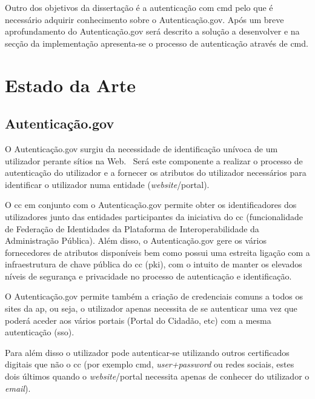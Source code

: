 Outro dos objetivos da dissertação é a autenticação com \acrfull{cmd} pelo que é necessário adquirir conhecimento sobre o Autenticação.gov.
Após um breve aprofundamento do Autenticação.gov será descrito a solução a desenvolver e na secção da implementação apresenta-se o processo de autenticação através de \acrlong{cmd}.

\section{Estado da Arte}

\subsection{Autenticação.gov}
O Autenticação.gov surgiu da necessidade de identificação unívoca de um utilizador perante sítios na 
Web.~\cite{agov} Será este componente a realizar o processo de autenticação do utilizador e a fornecer
 os atributos do utilizador necessários para identificar o utilizador numa entidade (\textit{website}/portal).

O \acrshort{cc} em conjunto com o Autenticação.gov permite obter os identificadores dos utilizadores junto das 
entidades participantes da iniciativa do \acrshort{cc} (funcionalidade de Federação de Identidades da Plataforma 
de Interoperabilidade da Administração Pública). Além disso, o Autenticação.gov gere os vários fornecedores de 
atributos disponíveis bem como possui uma estreita ligação com a infraestrutura de chave pública do \acrlong{cc} 
(\acrfull{pki}), com o intuito de manter os elevados níveis de segurança e privacidade no processo de autenticação 
e identificação.~\cite{agov}

O Autenticação.gov permite também a criação de credenciais comuns a todos os sites da \acrshort{ap}, ou seja, 
o utilizador apenas necessita de se autenticar uma vez que poderá aceder aos vários portais (Portal do Cidadão, 
etc) com a mesma autenticação (\acrshort{sso}).

Para além disso o utilizador pode autenticar-se utilizando outros certificados digitais que não o \acrshort{cc} 
(por exemplo \acrfull{cmd}, \textit{user+password} ou redes sociais, estes dois últimos quando o 
\textit{website}/portal necessita apenas de conhecer do utilizador o \textit{email}).

